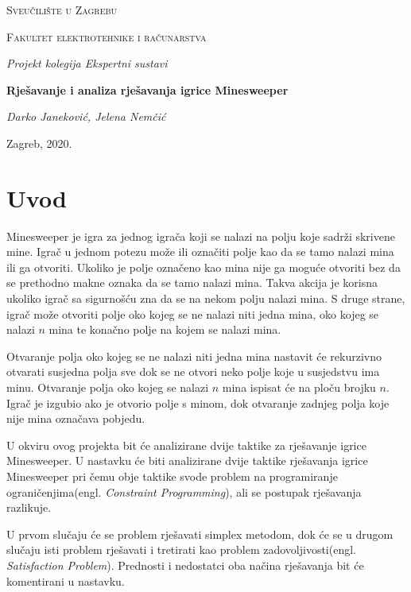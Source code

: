 \documentclass{article}
\begin{document}
\begin{titlepage}
	\centering
	{\scshape\LARGE Sveučilište u Zagrebu\par}
	\vspace{0.5cm}
	{\scshape\Large Fakultet elektrotehnike i računarstva\par}
    \vfill
	{\Large\itshape Projekt kolegija Ekspertni sustavi \par}
	\vspace{0.5cm}
	{\huge\bfseries Rješavanje i analiza rješavanja igrice Minesweeper\par}
	\vspace{0.5cm}
	{\Large\itshape Darko Janeković, Jelena Nemčić \par}
	\vfill
	{\large Zagreb, 2020.}
\end{titlepage}

\section{Uvod}

Minesweeper je igra za jednog igrača koji se nalazi na polju koje sadrži skrivene mine. Igrač
u jednom potezu može ili označiti polje kao da se tamo nalazi mina ili ga otvoriti. Ukoliko je
polje označeno kao mina nije ga moguće otvoriti bez da se prethodno makne oznaka da se tamo
nalazi mina. Takva akcija je korisna ukoliko igrač sa sigurnošću zna da se na nekom polju
nalazi mina. S druge strane, igrač može otvoriti polje oko kojeg se ne nalazi niti jedna
mina, oko kojeg se nalazi $n$ mina te konačno polje na kojem se nalazi mina.

Otvaranje polja oko kojeg se ne nalazi niti jedna mina nastavit će rekurzivno otvarati susjedna
polja sve dok se ne otvori neko polje koje u susjedstvu ima minu. Otvaranje polja oko kojeg
se nalazi $n$ mina ispisat će na ploču brojku $n$. Igrač je izgubio ako je otvorio polje s minom, dok otvaranje zadnjeg polja koje nije mina
označava pobjedu.

U okviru ovog projekta bit će analizirane dvije taktike za rješavanje igrice Minesweeper.
U nastavku će biti analizirane dvije taktike rješavanja igrice Minesweeper pri čemu obje
taktike svode problem na  programiranje ograničenjima(engl. \textit{Constraint Programming}),
ali se postupak rješavanja razlikuje.

U prvom slučaju će se problem rješavati simplex metodom, dok će se u drugom slučaju isti
problem rješavati i tretirati kao problem zadovoljivosti(engl. \textit{Satisfaction Problem}).
Prednosti i nedostatci oba načina rješavanja bit će komentirani u nastavku.
\end{document}

